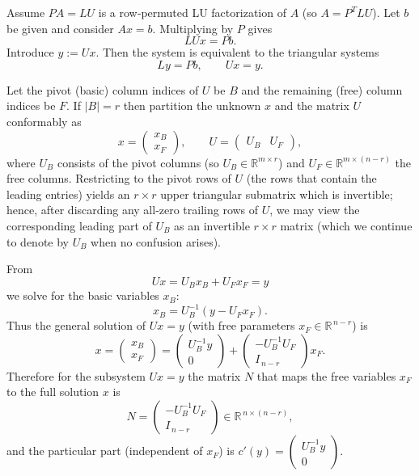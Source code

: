 \documentclass{article}
\begin{document}
Assume \(PA=LU\) is a row‑permuted LU factorization of \(A\) (so \(A=P^{T}LU\)). Let \(b\) be given and consider \(Ax=b\). Multiplying by \(P\) gives
\[
LUx=Pb.
\]
Introduce \(y:=Ux\). Then the system is equivalent to the triangular systems
\[
Ly=Pb,\qquad Ux=y.
\]

Let the pivot (basic) column indices of \(U\) be \(B\) and the remaining (free) column indices be \(F\). If \(|B|=r\) then partition the unknown \(x\) and the matrix \(U\) conformably as
\[
x=\begin{pmatrix}x_B\\[2pt] x_F\end{pmatrix},\qquad
U=\begin{pmatrix}U_B & U_F\end{pmatrix},
\]
where \(U_B\) consists of the pivot columns (so \(U_B\in\mathbb{R}^{m\times r}\)) and \(U_F\in\mathbb{R}^{m\times(n-r)}\) the free columns. Restricting to the pivot rows of \(U\) (the rows that contain the leading entries) yields an \(r\times r\) upper triangular submatrix which is invertible; hence, after discarding any all‑zero trailing rows of \(U\), we may view the corresponding leading part of \(U_B\) as an invertible \(r\times r\) matrix (which we continue to denote by \(U_B\) when no confusion arises).

From
\[
Ux = U_B x_B + U_F x_F = y
\]
we solve for the basic variables \(x_B\):
\[
x_B = U_B^{-1}(y - U_F x_F).
\]
Thus the general solution of \(Ux=y\) (with free parameters \(x_F\in\mathbb{R}^{\,n-r}\)) is
\[
x=\begin{pmatrix}x_B\\[2pt] x_F\end{pmatrix}
=\begin{pmatrix}U_B^{-1}y\\[2pt] 0\end{pmatrix}
+\begin{pmatrix}-U_B^{-1}U_F\\[2pt] I_{\,n-r}\end{pmatrix}x_F.
\]
Therefore for the subsystem \(Ux=y\) the matrix \(N\) that maps the free variables \(x_F\) to the full solution \(x\) is
\[
N=\begin{pmatrix}-U_B^{-1}U_F\\[3pt] I_{\,n-r}\end{pmatrix}\in\mathbb{R}^{\,n\times(n-r)},
\]
and the particular part (independent of \(x_F\)) is \(c'(y)=\begin{pmatrix}U_B^{-1}y\\[2pt]0\end{pmatrix}\).
\end{document}
